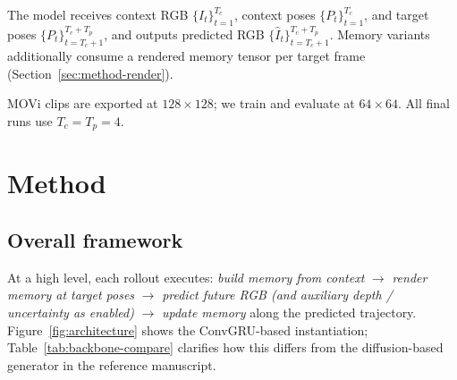 \documentclass[11pt]{article}
\begin{document}
The model receives context RGB $\{I_t\}_{t=1}^{T_c}$, context poses $\{P_t\}_{t=1}^{T_c}$, and target poses
$\{P_t\}_{t=T_c+1}^{T_c+T_p}$, and outputs predicted RGB $\{\hat I_t\}_{t=T_c+1}^{T_c+T_p}$. Memory
variants additionally consume a rendered memory tensor per target frame (Section~\ref{sec:method-render}).

MOVi clips are exported at $128\times128$; we train and evaluate at $64\times64$. All final runs use
$T_c=T_p=4$.

\section{Method}
\label{sec:method}

\subsection{Overall framework}

At a high level, each rollout executes:
\emph{build memory from context} $\rightarrow$ \emph{render memory at target poses} $\rightarrow$
\emph{predict future RGB (and auxiliary depth / uncertainty as enabled)} $\rightarrow$
\emph{update memory} along the predicted trajectory.
Figure~\ref{fig:architecture} shows the ConvGRU-based instantiation; Table~\ref{tab:backbone-compare}
clarifies how this differs from the diffusion-based generator in the reference manuscript.
\end{document}

